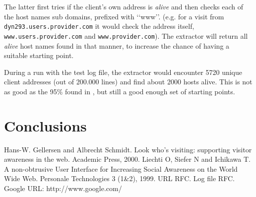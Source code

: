 \documentclass[a4paper]{danarticle}
\begin{document}
      The latter first tries if the client's own 
      address is \textit{alive}
      and then checks each of the host names sub domains, prefixed with 
      \lq\lq www\rq\rq . (e.g. for a visit from \verb$dyn293.users.provider.com$
      it would check the address itself, \verb$www.users.provider.com$ and 
      \verb$www.provider.com$). The extractor will return all \textit{alive}
      host names found in that manner, to increase the chance of having
      a suitable starting point.
      
      During a run with the test log file, the extractor would encounter 5720
      unique client addresses (out of 200.000 lines) and find about 2000
      hosts alive. This is not as good as the 95\% found in \cite{webaware}, but
      still a good enough set of starting points.
  \section*{Conclusions}
  
  \begin{thebibliography}{99}
     Hans-W. Gellersen and Albrecht Schmidt.
    Look who's visiting: supporting visitor awareness in the web.
    Academic Press, 2000.
     Liechti O, Siefer N and Ichikawa T.
    A non-obtrusive User Interface for Increasing Social Awareness on the 
    World Wide Web. Personale Technologies 3 (1\&2), 1999.
     URL RFC.
     Log file RFC.
     Google URL: http://www.google.com/
  \end{thebibliography}
\end{document}
